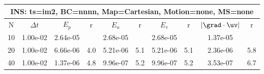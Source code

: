 
\begin{tabular}{|c|c|c|c|c|c|c|c|c|c|} \hline
 \multicolumn{10}{|c|}{INS: ts=im2, BC=nnnn, Map=Cartesian, Motion=none, MS=none } \\ \hline 
     N  &   $\Delta t$ & $E_p$   &  r  &   $E_u$   &   r    &   $E_v$   & r   &  $|\grad\cdot\uv|$  & r   \\ \hline 
  10   &  1.00e-02  &   2.64e-05  &        &   2.68e-05  &        &   2.68e-05  &        &   1.37e-05  &        \\ 
  20   &  1.00e-02  &   6.66e-06  & 4.0  &   5.21e-06  & 5.1  &   5.21e-06  & 5.1  &   2.36e-06  & 5.8  \\ 
  40   &  1.00e-02  &   1.37e-06  & 4.8  &   9.96e-07  & 5.2  &   9.96e-07  & 5.2  &   3.53e-07  & 6.7  \\ 
 \hline 
\end{tabular}
